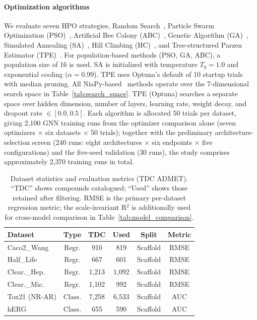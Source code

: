 \documentclass[journal]{IEEEtran}
\begin{document}
\paragraph{Optimization algorithms}
We evaluate seven HPO strategies, Random Search~\cite{bergstra2012random}, Particle Swarm Optimization (PSO)~\cite{kennedy1995pso}, Artificial Bee Colony (ABC)~\cite{karaboga2005abc}, Genetic Algorithm (GA)~\cite{holland1975ga}, Simulated Annealing (SA)~\cite{saopt}, Hill Climbing (HC)~\cite{russell2010aima}, and Tree-structured Parzen Estimator (TPE)~\cite{akiba2019optuna}. For population-based methods (PSO, GA, ABC), a population size of 16 is used. SA is initialized with temperature $T_0 = 1.0$ and exponential cooling ($\alpha = 0.99$). TPE uses Optuna's default of 10 startup trials with median pruning. All NiaPy-based~\cite{niapy} methods operate over the 7-dimensional search space in Table~\ref{tab:search_space}. TPE (Optuna) searches a separate space over hidden dimension, number of layers, learning rate, weight decay, and dropout rate $\in [0.0, 0.5]$. Each algorithm is allocated 50 trials per dataset, giving 2{,}100 GNN training runs from the optimizer comparison alone (seven optimizers $\times$ six datasets $\times$ 50 trials); together with the preliminary architecture-selection screen (240 runs: eight architectures $\times$ six endpoints $\times$ five configurations) and the five-seed validation (30 runs), the study comprises approximately 2{,}370 training runs in total.

\begin{table}[!t]
\centering
\caption{Dataset statistics and evaluation metrics (TDC ADMET). ``TDC'' shows compounds catalogued; ``Used'' shows those retained after filtering. RMSE is the primary per-dataset regression metric; the scale-invariant R$^2$ is additionally used for cross-model comparison in Table~\ref{tab:model_comparison}.}
\label{tab:dataset_stats}
\small
\begin{tabular}{lccccc}
\toprule
\textbf{Dataset} & \textbf{Type} & \textbf{TDC} & \textbf{Used} & \textbf{Split} & \textbf{Metric} \\
\midrule
Caco2\_Wang & Regr. & 910 & 819 & Scaffold & RMSE \\
Half\_Life & Regr. & 667 & 601 & Scaffold & RMSE \\
Clear.\_Hep. & Regr. & 1,213 & 1,092 & Scaffold & RMSE \\
Clear.\_Mic. & Regr. & 1,102 & 992 & Scaffold & RMSE \\
Tox21 (NR-AR) & Class. & 7,258 & 6,533 & Scaffold & AUC \\
hERG & Class. & 655 & 590 & Scaffold & AUC \\
\bottomrule
\end{tabular}
\end{table}
\end{document}
